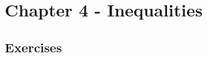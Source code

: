 
\newpage
\section{Chapter 4 - Inequalities}

\subsection*{Exercises}







\begin{comment}

    \bigskip\noindent
    \textbf{3.2X}\\  %
    
    
    \begin{align*}
        A &= B
    \end{align*}
    
    
    \begin{equation*}
        A = B
        \tag*{\qed}
    \end{equation*}
    
    
    \begin{lstlisting}[style=RSyntax, title=R]
    # Code
    \end{lstlisting}
    
    \begin{verbatim}
    # Output
    \end{verbatim}
    
    
    
    
    
    
    \begin{figure}[H]
        \begin{minipage}{0.5\textwidth}
        \end{minipage}
        \begin{minipage}{0.5\textwidth}
        \end{minipage}
    \end{figure}
    

\end{comment}
